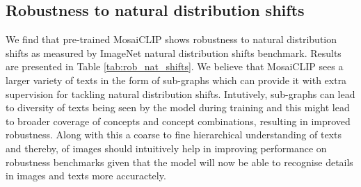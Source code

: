 \documentclass[11pt]{article}
\newcommand{\methodcomp}{MosaiCLIP}
\begin{document}
\subsection{Robustness to natural distribution shifts}
\label{robustness_detailed_results}
We find that pre-trained \methodcomp{} shows robustness to natural distribution shifts as measured by ImageNet natural distribution shifts benchmark. Results are presented in Table \ref{tab:rob_nat_shifts}. We believe that \methodcomp{} sees a larger variety of texts in the form of sub-graphs which can provide it with extra supervision for tackling natural distribution shifts. Intutively, sub-graphs can lead to diversity of texts being seen by the model during training and this might lead to broader coverage of concepts and concept combinations, resulting in improved robustness. Along with this a coarse to fine 
 hierarchical understanding of texts and thereby, of images should intuitively help in improving performance on robustness benchmarks given that the model will now be able to recognise details in images and texts more accuractely.
\end{document}
